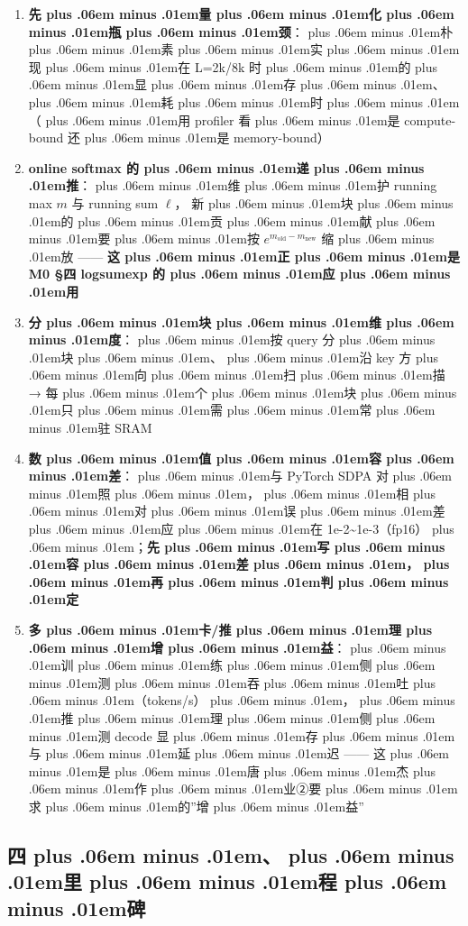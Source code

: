 \documentclass[
]{article}
\providecommand{\tightlist}{%
  \setlength{\itemsep}{0pt}\setlength{\parskip}{0pt}}
\def\zh#1{{\zhfont #1}}
\def\sym#1{{\symfont #1}}
\def\zhglue{\hskip0pt plus .06em minus .01em}
\begin{document}
\begin{enumerate}
\def\labelenumi{\arabic{enumi}.}
\tightlist
\item
  \textbf{\zh{先\zhglue 量\zhglue 化\zhglue 瓶\zhglue 颈}}\zh{：\zhglue 朴\zhglue 素\zhglue 实\zhglue 现\zhglue 在} L=2k/8k \zh{时\zhglue 的\zhglue 显\zhglue 存\zhglue 、\zhglue 耗\zhglue 时\zhglue （\zhglue 用} profiler \zh{看\zhglue 是} compute-bound \zh{还\zhglue 是} memory-bound\zh{）}
\item
  \textbf{online softmax \zh{的\zhglue 递\zhglue 推}}\zh{：\zhglue 维\zhglue 护} running max \(m\) \zh{与} running sum \(\ell\)\zh{，} \zh{新\zhglue 块\zhglue 的\zhglue 贡\zhglue 献\zhglue 要\zhglue 按} \(e^{m_{\text{old}}-m_{\text{new}}}\) \zh{缩\zhglue 放} ------ \textbf{\zh{这\zhglue 正\zhglue 是} M0 \sym{§}\zh{四} logsumexp \zh{的\zhglue 应\zhglue 用}}
\item
  \textbf{\zh{分\zhglue 块\zhglue 维\zhglue 度}}\zh{：\zhglue 按} query \zh{分\zhglue 块\zhglue 、\zhglue 沿} key \zh{方\zhglue 向\zhglue 扫\zhglue 描} \sym{→} \zh{每\zhglue 个\zhglue 块\zhglue 只\zhglue 需\zhglue 常\zhglue 驻} SRAM
\item
  \textbf{\zh{数\zhglue 值\zhglue 容\zhglue 差}}\zh{：\zhglue 与} PyTorch SDPA \zh{对\zhglue 照\zhglue ，\zhglue 相\zhglue 对\zhglue 误\zhglue 差\zhglue 应\zhglue 在} 1e-2\textasciitilde1e-3\zh{（}fp16\zh{）\zhglue ；}\textbf{\zh{先\zhglue 写\zhglue 容\zhglue 差\zhglue ，\zhglue 再\zhglue 判\zhglue 定}}
\item
  \textbf{\zh{多\zhglue 卡}/\zh{推\zhglue 理\zhglue 增\zhglue 益}}\zh{：\zhglue 训\zhglue 练\zhglue 侧\zhglue 测\zhglue 吞\zhglue 吐\zhglue （}tokens/s\zh{）\zhglue ，\zhglue 推\zhglue 理\zhglue 侧\zhglue 测} decode \zh{显\zhglue 存\zhglue 与\zhglue 延\zhglue 迟} ------ \zh{这\zhglue 是\zhglue 唐\zhglue 杰\zhglue 作\zhglue 业}\sym{②}\zh{要\zhglue 求\zhglue 的}''\zh{增\zhglue 益}''
\end{enumerate}

\subsection{\zh{四\zhglue 、\zhglue 里\zhglue 程\zhglue 碑}}\label{ux56dbux91ccux7a0bux7891}
\end{document}
